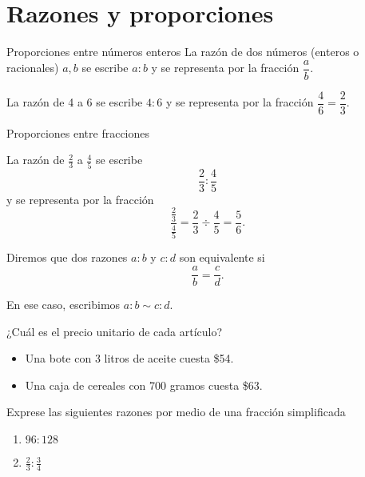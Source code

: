 \section{Razones y proporciones}

{Proporciones entre números enteros}
	La raz\'on de dos números (enteros o racionales) $a,b$ se escribe $a:b$ y se representa por la fracci\'on $\dfrac{a}{b}.$
	
	\begin{problema}
		La raz\'on de 4 a 6 se escribe $4:6$ y se representa por la fracci\'on $\dfrac{4}{6}=\dfrac{2}{3}.$ 
	\end{problema}
	
	


{Proporciones entre fracciones}
	\begin{problema}
		La raz\'on de $\frac{2}{3}$ a $\frac{4}{5}$ se escribe $$\dfrac{2}{3}:\dfrac{4}{5}$$ y se representa por la fracci\'on
		$$
		\dfrac{\frac{2}{3}}{\frac{4}{5}}
		=\dfrac{2}{3}\div\dfrac{4}{5}=\dfrac{5}{6}.
		$$
	\end{problema}
	



	Diremos que dos razones $a:b$ y $c:d$ son equivalente si 
	$$\dfrac{a}{b}=\dfrac{c}{d}.$$
	
	En ese caso, escribimos $a:b \sim c:d.$



	\begin{problema}
		¿Cuál es el precio unitario de cada art\'iculo?
		\begin{itemize}
			\item Una bote con 3 litros de aceite cuesta \$54.
			\item Una caja de cereales con 700 gramos cuesta \$63.
		\end{itemize}
		
	\end{problema}
	



	\begin{problema}
		Exprese las siguientes razones por medio de una fracci\'on simplificada
		\begin{enumerate}
			\item $96:128$
			\item $\frac{2}{3}:\frac{3}{4}$
		\end{enumerate}
		
	\end{problema}
	



